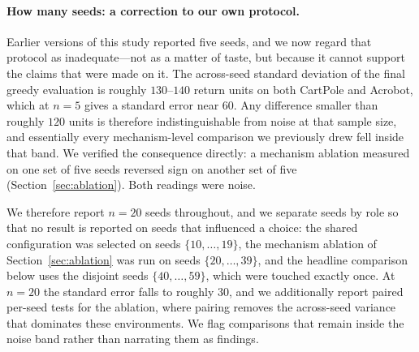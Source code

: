 \documentclass[11pt]{article}
\begin{document}
\paragraph{How many seeds: a correction to our own protocol.}
\label{par:power}
Earlier versions of this study reported five seeds, and we now regard that
protocol as inadequate---not as a matter of taste, but because it cannot
support the claims that were made on it. The across-seed standard deviation of
the final greedy evaluation is roughly $130$--$140$ return units on both
CartPole and Acrobot, which at $n{=}5$ gives a standard error near $60$. Any
difference smaller than roughly $120$ units is therefore indistinguishable from
noise at that sample size, and essentially every mechanism-level comparison we
previously drew fell inside that band. We verified the consequence directly: a
mechanism ablation measured on one set of five seeds reversed sign on another
set of five (Section~\ref{sec:ablation}). Both readings were noise.

We therefore report $n{=}20$ seeds throughout, and we separate seeds by role so
that no result is reported on seeds that influenced a choice: the shared
configuration was selected on seeds $\{10,\dots,19\}$, the mechanism ablation of
Section~\ref{sec:ablation} was run on seeds $\{20,\dots,39\}$, and the headline
comparison below uses the disjoint seeds $\{40,\dots,59\}$, which were touched
exactly once. At $n{=}20$ the standard error falls to roughly $30$, and we
additionally report paired per-seed tests for the ablation, where pairing
removes the across-seed variance that dominates these environments. We flag
comparisons that remain inside the noise band rather than narrating them as
findings.
\end{document}
